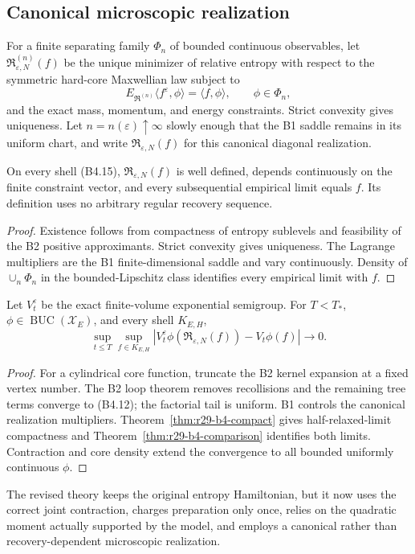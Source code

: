 \subsection{Canonical microscopic realization}

For a finite separating family $\Phi_n$ of bounded continuous observables,
let $\mathfrak R^{(n)}_{\varepsilon,N}(f)$ be the unique minimizer of relative
entropy with respect to the symmetric hard-core Maxwellian law subject to
\[
 E_{\mathfrak R^{(n)}}\langle f^{\varepsilon},\phi\rangle
 =\langle f,\phi\rangle,
 \qquad \phi\in\Phi_n,                                    \tag{B4.16}
\]
and the exact mass, momentum, and energy constraints.  Strict convexity gives
uniqueness.  Let $n=n(\varepsilon)\uparrow\infty$ slowly enough that the B1
saddle remains in its uniform chart, and write
$\mathfrak R_{\varepsilon,N}(f)$ for this canonical diagonal realization.

\begin{lemma}
\label{lem:r29-b4-realization}
On every shell (B4.15),
$\mathfrak R_{\varepsilon,N}(f)$ is well defined, depends continuously on the
finite constraint vector, and every subsequential empirical limit equals
$f$.  Its definition uses no arbitrary regular recovery sequence.
\end{lemma}

\begin{proof}
Existence follows from compactness of entropy sublevels and feasibility of the
B2 positive approximants.  Strict convexity gives uniqueness.  The Lagrange
multipliers are the B1 finite-dimensional saddle and vary continuously.
Density of $\cup_n\Phi_n$ in the bounded-Lipschitz class identifies every
empirical limit with $f$.
\end{proof}

\begin{theorem}
\label{thm:r29-b4-limit}
Let $V_t^\varepsilon$ be the exact finite-volume exponential semigroup.  For
$T<T_*$, $\phi\in\operatorname{BUC}(\mathcal X_E)$, and every shell
$K_{E,H}$,
\[
 \sup_{t\le T}\sup_{f\in K_{E,H}}
 \left|V_t^\varepsilon\phi(\mathfrak R_{\varepsilon,N}(f))
       -V_t\phi(f)\right|\longrightarrow0.                \tag{B4.17}
\]
\end{theorem}

\begin{proof}
For a cylindrical core function, truncate the B2 kernel expansion at a fixed
vertex number.  The B2 loop theorem removes recollisions and the remaining
tree terms converge to (B4.12); the factorial tail is uniform.  B1 controls
the canonical realization multipliers.  Theorem~\ref{thm:r29-b4-compact}
gives half-relaxed-limit compactness and
Theorem~\ref{thm:r29-b4-comparison} identifies both limits.  Contraction and
core density extend the convergence to all bounded uniformly continuous
$\phi$.
\end{proof}

The revised theory keeps the original entropy Hamiltonian, but it now uses the
correct joint contraction, charges preparation only once, relies on the
quadratic moment actually supported by the model, and employs a canonical
rather than recovery-dependent microscopic realization.
